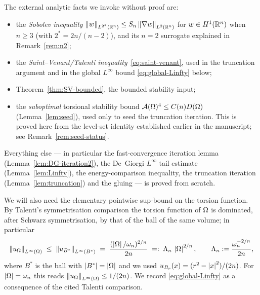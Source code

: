 The external analytic facts we invoke without proof are:
\begin{itemize}
\item the \emph{Sobolev inequality}
   $\left\|w\right\|_{L^{2^*}(\mathbb R^n)}\le S_n\left\|\nabla w\right\|_{L^2(\mathbb R^n)}$ for
   $w\in H^1(\mathbb R^n)$ when $n\ge3$ (with $2^*=2n/(n-2)$), and its $n=2$
   surrogate explained in Remark~\ref{rem:n2};
\item the \emph{Saint--Venant/Talenti inequality}~\eqref{eq:saint-venant},
   used in the truncation argument and in the global $L^\infty$ bound
   \eqref{eq:global-Linfty} below;
\item Theorem~\ref{thm:SV-bounded}, the bounded stability input;
\item the \emph{suboptimal} torsional stability bound
   $\mathcal A(\Omega)^4\le C(n)D(\Omega)$ (Lemma~\ref{lem:seed}), used only to seed
   the truncation iteration. This is proved here from the level-set identity
   established earlier in the manuscript; see Remark~\ref{rem:seed-status}.
\end{itemize}
Everything else --- in particular the fast-convergence iteration lemma
(Lemma~\ref{lem:DG-iteration2}), the De~Giorgi $L^\infty$ tail estimate
(Lemma~\ref{lem:Linfty}), the energy-comparison inequality, the truncation
iteration (Lemma~\ref{lem:truncation}) and the gluing --- is proved from
scratch.

We will also need the elementary pointwise sup-bound on the torsion
function. By Talenti's symmetrisation comparison the torsion function of
$\Omega$ is dominated, after Schwarz symmetrisation, by that of the ball of
the same volume; in particular
\begin{equation}\label{eq:global-Linfty}
   \left\|u_\Omega\right\|_{L^\infty(\Omega)}\;\le\;\left\|u_{B^*}\right\|_{L^\infty(B^*)}
   \;=\;\frac{(\left|\Omega\right|/\omega_n)^{2/n}}{2n}
   \;=:\;\Lambda_n\,\left|\Omega\right|^{2/n},
   \qquad \Lambda_n:=\frac{\omega_n^{-2/n}}{2n},
\end{equation}
where $B^*$ is the ball with $\left|B^*\right|=\left|\Omega\right|$ and we used
$u_{B_r}(x)=(r^2-\left|x\right|^2)/(2n)$. For $\left|\Omega\right|=\omega_n$ this reads
$\left\|u_\Omega\right\|_{L^\infty(\Omega)}\le 1/(2n)$. We record \eqref{eq:global-Linfty}
as a consequence of the cited Talenti comparison.

